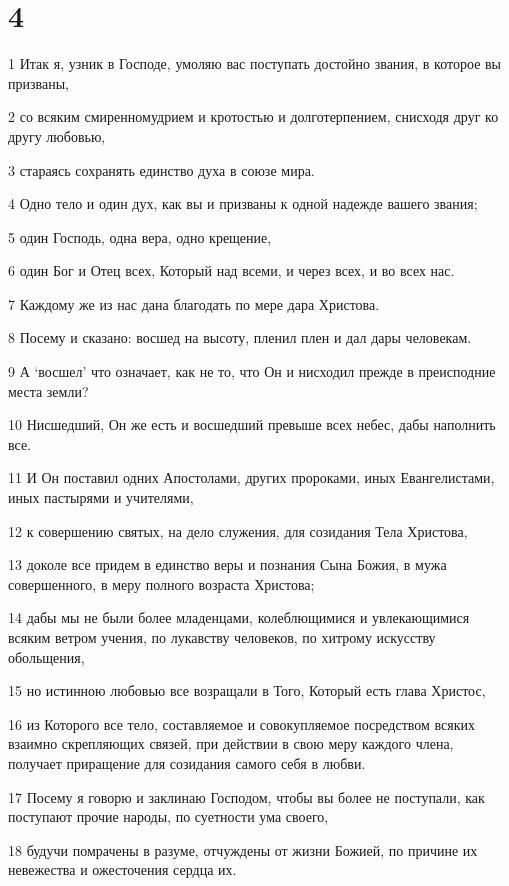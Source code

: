 \chapter{4}

\par 1 Итак я, узник в Господе, умоляю вас поступать достойно звания, в которое вы призваны,
\par 2 со всяким смиренномудрием и кротостью и долготерпением, снисходя друг ко другу любовью,
\par 3 стараясь сохранять единство духа в союзе мира.
\par 4 Одно тело и один дух, как вы и призваны к одной надежде вашего звания;
\par 5 один Господь, одна вера, одно крещение,
\par 6 один Бог и Отец всех, Который над всеми, и через всех, и во всех нас.
\par 7 Каждому же из нас дана благодать по мере дара Христова.
\par 8 Посему и сказано: восшед на высоту, пленил плен и дал дары человекам.
\par 9 А `восшел' что означает, как не то, что Он и нисходил прежде в преисподние места земли?
\par 10 Нисшедший, Он же есть и восшедший превыше всех небес, дабы наполнить все.
\par 11 И Он поставил одних Апостолами, других пророками, иных Евангелистами, иных пастырями и учителями,
\par 12 к совершению святых, на дело служения, для созидания Тела Христова,
\par 13 доколе все придем в единство веры и познания Сына Божия, в мужа совершенного, в меру полного возраста Христова;
\par 14 дабы мы не были более младенцами, колеблющимися и увлекающимися всяким ветром учения, по лукавству человеков, по хитрому искусству обольщения,
\par 15 но истинною любовью все возращали в Того, Который есть глава Христос,
\par 16 из Которого все тело, составляемое и совокупляемое посредством всяких взаимно скрепляющих связей, при действии в свою меру каждого члена, получает приращение для созидания самого себя в любви.
\par 17 Посему я говорю и заклинаю Господом, чтобы вы более не поступали, как поступают прочие народы, по суетности ума своего,
\par 18 будучи помрачены в разуме, отчуждены от жизни Божией, по причине их невежества и ожесточения сердца их.
